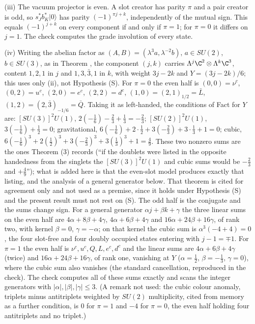 (iii) The vacuum projector is even. A slot creator has parity $\pi$ and a pair creator is odd, so $s_{J}^{*}b_{K}^{*}\lvert 0 \rangle$ has parity $(-1)^{\pi j + k}$, independently of the mutual sign. This equals $(-1)^{j + k}$ on every component if and only if $\pi = 1$; for $\pi = 0$ it differs on $j = 1$. The check computes the grade involution of every state.

(iv) Writing the abelian factor as $(A, B) = (\lambda^{3}a, \lambda^{-2}b)$, $a \in SU(2)$, $b \in SU(3)$, as in Theorem , the component $(j, k)$ carries $\Lambda^{j}\C^{2} \otimes \Lambda^{k}\C^{3}$, content $1, 2, 1$ in $j$ and $1, 3, \bar{3}, 1$ in $k$, with weight $3j - 2k$ and $Y = (3j - 2k)/6$; this uses only (ii), not Hypothesis (S). For $\pi = 0$ the even half is $(0,0) = \nu^{c}$, $(0,2) = u^{c}$, $(2,0) = e^{c}$, $(2,2) = d^{c}$, $(1,0) = (2,1)_{1/2} = \bar{L}$, $(1,2) = (2,\bar{3})_{-1/6} = \bar{Q}$. Taking it as left-handed, the conditions of Fact  for $Y$ are: $[SU(3)]^{2}U(1)$, $2(-\tfrac16) - \tfrac23 + \tfrac13 = -\tfrac23$; $[SU(2)]^{2}U(1)$, $3(-\tfrac16) + \tfrac12 = 0$; gravitational, $6(-\tfrac16) + 2 \cdot \tfrac12 + 3(-\tfrac23) + 3 \cdot \tfrac13 + 1 = 0$; cubic, $6(-\tfrac16)^{3} + 2(\tfrac12)^{3} + 3(-\tfrac23)^{3} + 3(\tfrac13)^{3} + 1 = \tfrac49$. These two nonzero sums are the ones Theorem (3) records (``if the doublets were listed in the opposite handedness from the singlets the $[SU(3)]^{2}U(1)$ and cubic sums would be $-\tfrac23$ and $+\tfrac49$''); what is added here is that the even-slot model produces exactly that listing, and the analysis of a general generator below. That theorem is cited for agreement only and not used as a premise, since it holds under Hypothesis (S) and the present result must not rest on (S). The odd half is the conjugate and the sums change sign. For a general generator $\alpha j + \beta k + \gamma$ the three linear sums on the even half are $4\alpha + 8\beta + 4\gamma$, $4\alpha + 6\beta + 4\gamma$ and $16\alpha + 24\beta + 16\gamma$, of rank two, with kernel $\beta = 0$, $\gamma = -\alpha$; on that kernel the cubic sum is $\alpha^{3}(-4 + 4) = 0$, the four slot-free and four doubly occupied states entering with $j - 1 = \mp 1$. For $\pi = 1$ the even half is $\nu^{c}, u^{c}, Q, L, e^{c}, d^{c}$ and the linear sums are $4\alpha + 6\beta + 4\gamma$ (twice) and $16\alpha + 24\beta + 16\gamma$, of rank one, vanishing at $Y$ ($\alpha = \tfrac12$, $\beta = -\tfrac13$, $\gamma = 0$), where the cubic sum also vanishes (the standard cancellation, reproduced in the check). The check computes all of these sums exactly and scans the integer generators with $|\alpha|, |\beta|, |\gamma| \le 3$. (A remark not used: the cubic colour anomaly, triplets minus antitriplets weighted by $SU(2)$ multiplicity, cited from memory as a further condition, is $0$ for $\pi = 1$ and $-4$ for $\pi = 0$, the even half holding four antitriplets and no triplet.)

